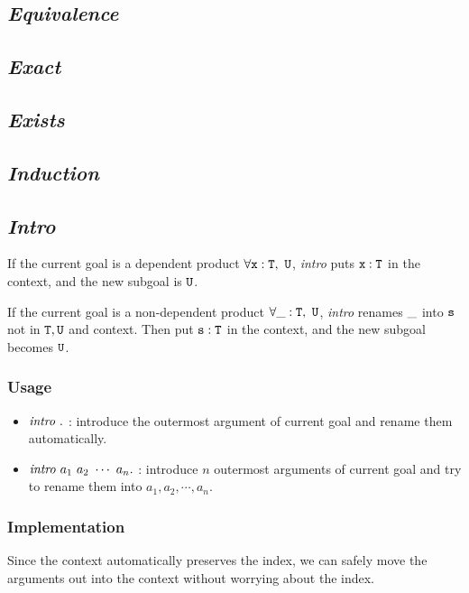 \subsection{\it Equivalence}

\subsection{\it Exact}

\subsection{\it Exists}

\subsection{\it Induction}

\subsection{\it Intro}

If the current goal is a dependent product $\tt \forall x:T,\ U$, \textit{intro} puts 
$\tt x:T$ in the context, and the new subgoal is $\tt U$.\par
If the current goal is a non-dependent product $\tt \forall \_:T,\ U$, \textit{intro} renames
$\tt \_$ into $\tt s$ not in $\tt T,U$ and context. Then put $\tt s:T$ in the context, 
and the new subgoal becomes $\tt U$.

\subsubsection*{Usage}
\begin{itemize}
\item ${\it intro}\ .$ : introduce the outermost argument of current goal and rename them automatically.
\item ${\it intro}\ a_1\ a_2\ \cdots\ a_n.$ : introduce $n$ outermost arguments of current goal and
try to rename them into $a_1,a_2,\cdots,a_n$.
\end{itemize}

\subsubsection*{Implementation}
Since the context automatically preserves the index, we
can safely move the arguments out into the context without worrying about the index.

